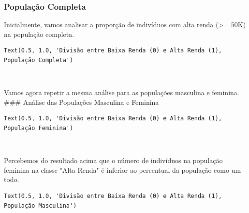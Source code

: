 \documentclass[11pt]{article}
\begin{document}
    \subsubsection{População Completa}\label{populauxe7uxe3o-completa}

Inicialmente, vamos analisar a proporção de indivíduos com alta renda
(\textgreater{}= 50K) na população completa.

    
    \begin{verbatim}
Text(0.5, 1.0, 'Divisão entre Baixa Renda (0) e Alta Renda (1), População Completa')
    \end{verbatim}

    
    \begin{center}
    \end{center}
    { \hspace*{\fill} \\}
    
    Vamos agora repetir a mesma análise para as populações masculina e
feminina. \#\#\# Análise das Populações Masculina e Feminina

    
    \begin{verbatim}
Text(0.5, 1.0, 'Divisão entre Baixa Renda (0) e Alta Renda (1), População Feminina')
    \end{verbatim}

    
    \begin{center}
    \end{center}
    { \hspace*{\fill} \\}
    
    Percebemos do resultado acima que o número de indivíduos na população
feminina na classe "Alta Renda" é inferior ao percentual da população
como um todo.

    
    \begin{verbatim}
Text(0.5, 1.0, 'Divisão entre Baixa Renda (0) e Alta Renda (1), População Masculina')
    \end{verbatim}

    
    \begin{center}
    \end{center}
    { \hspace*{\fill} \\}
    
\end{document}
